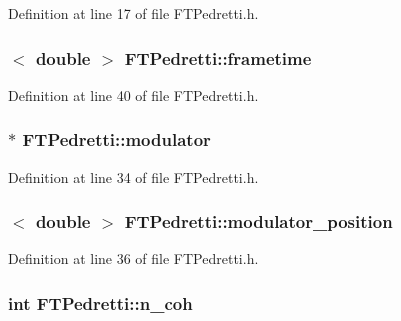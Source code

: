 Definition at line 17 of file FTPedretti.h.

\hypertarget{classFTPedretti_a3100d1c07aa75cee3c5c81814f92f8c3}{
\subsubsection[{frametime}]{$<$ double $>$ {\bf FTPedretti::frametime}}}
\label{classFTPedretti_a3100d1c07aa75cee3c5c81814f92f8c3}


Definition at line 40 of file FTPedretti.h.

\hypertarget{classFTPedretti_ac366c4d6cd99a518c673d3636ab97245}{
\subsubsection[{modulator}]{$\ast$ {\bf FTPedretti::modulator}}}
\label{classFTPedretti_ac366c4d6cd99a518c673d3636ab97245}


Definition at line 34 of file FTPedretti.h.

\hypertarget{classFTPedretti_aeb6720656e824ab24b4f70d31cd7b40d}{
\subsubsection[{modulator\_\-position}]{$<$ double $>$ {\bf FTPedretti::modulator\_\-position}}}
\label{classFTPedretti_aeb6720656e824ab24b4f70d31cd7b40d}


Definition at line 36 of file FTPedretti.h.

\hypertarget{classFTPedretti_ad60e472d0ef298c0ccd9255662d2e92e}{
\subsubsection[{n\_\-coh}]{\setlength{\rightskip}{0pt plus 5cm}int {\bf FTPedretti::n\_\-coh}}}
\label{classFTPedretti_ad60e472d0ef298c0ccd9255662d2e92e}



